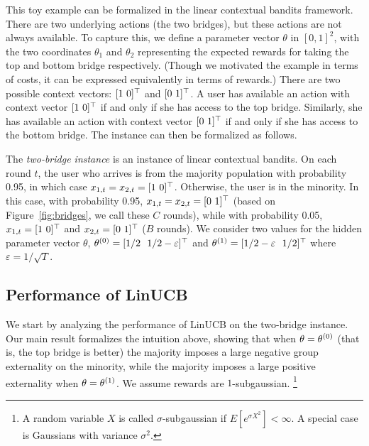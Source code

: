 This toy example can be formalized in the linear contextual bandits
framework. There are two underlying actions (the two bridges), but
these actions are not always available. To capture this, we define a
parameter vector $\theta$ in $[0, 1]^2$, with the two coordinates
$\theta_1$ and $\theta_2$ representing the expected rewards for taking
the top and bottom bridge respectively. (Though we motivated
the example in terms of costs, it can be expressed equivalently in
terms of rewards.) There are two possible context vectors:
$[1 ~ 0]^{\top}$ and $[0 ~ 1]^{\top}$. A user has available an action with
context vector $[1 ~ 0]^{\top}$ if and only if she has access to the top
bridge. Similarly, she has available an action with context vector
$[0 ~ 1]^{\top}$ if and only if she has access to the bottom bridge. The
instance can then be formalized as follows.



\begin{definition}
  The \emph{two-bridge instance} is an instance of linear contextual
  bandits. On each round $t$, the user who arrives is from the
  majority population with probability 0.95, in which case
  $x_{1, t} = x_{2, t} = [1 ~ 0]^{\top}$. Otherwise, the user is in the
  minority. In this case, with probability 0.95,
  $x_{1,t} = x_{2,t} = [0 ~ 1]^{\top}$ (based on
  Figure~\ref{fig:bridges}, we call these $C$ rounds), while with probability 0.05, $x_{1,t} = [1 ~ 0]^{\top}$ and
  $x_{2,t} = [0 ~ 1]^{\top}$ ($B$ rounds). We consider two
  values for the hidden parameter vector $\theta$,
  $\theta^{(0)} = [1/2 \ ~ 1/2 - \varepsilon]^{\top}$ and
  $\theta^{(1)} = [1/2 - \varepsilon \ ~ 1/2]^{\top}$ where
  $\varepsilon = 1/\sqrt{T}$.
\end{definition}


\subsection{Performance of LinUCB}


We start by analyzing the performance of LinUCB on the two-bridge
instance.  Our main result formalizes the intuition above, showing
that when $\theta = \theta^{(0)}$ (that is, the top bridge is better)
the majority imposes a large negative group externality on the
minority, while the majority imposes a large positive externality when
$\theta = \theta^{(1)}$. We assume rewards are $1$-subgaussian.%
\footnote{A random variable $X$ is called $\sigma$-subgaussian if $E[e^{\sigma X^2}]<\infty$. A special case is Gaussians with variance $\sigma^2$.}



